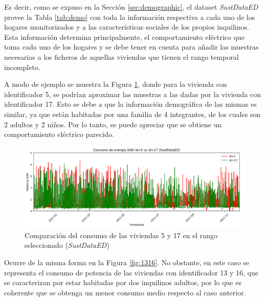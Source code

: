 \vspace{3mm}

Es decir, como se expuso en la Sección \ref{sec:demographic}, el dataset \textit{SustDataED} provee la Tabla \ref{tab:demo} con toda la información respectiva a cada uno de los hogares monitorizados y a las características sociales de los propios inquilinos. Esta información determina principalmente, el comportamiento eléctrico que toma cada uno de los hogares y se debe tener en cuenta para añadir las muestras necesarias a los ficheros de aquellas viviendas que tienen el rango temporal incompleto. 

\vspace{3mm}

A modo de ejemplo se muestra la Figura \ref{fig:517}, donde para la vivienda con identificador 5, se podrían aproximar las muestras a las dadas por la vivienda con identificador 17. Esto se debe a que la información demográfica de las mismas es similar, ya que están habitadas por una familia de 4 integrantes, de los cuales son 2 adultos y 2 niños. Por lo tanto, se puede apreciar que se obtiene un comportamiento eléctrico parecido. 

\vspace{3mm}

\begin{figure}[h!]
  \centering
  \includegraphics[width=1\textwidth]{img/diseno/517.png}
  \caption{Comparación del consumo de las viviendas 5 y 17 en el rango seleccionado (\textit{SustDataED})}
  \label{fig:517}
\end{figure}

\vspace{3mm}

Ocurre de la misma forma en la Figura \ref{fig:1316}. No obstante, en este caso se representa el consumo de potencia de las viviendas con identificador 13 y 16, que se caracterizan por estar habitadas por dos inquilinos adultos, por lo que es coherente que se obtenga un menor consumo medio respecto al caso anterior.

